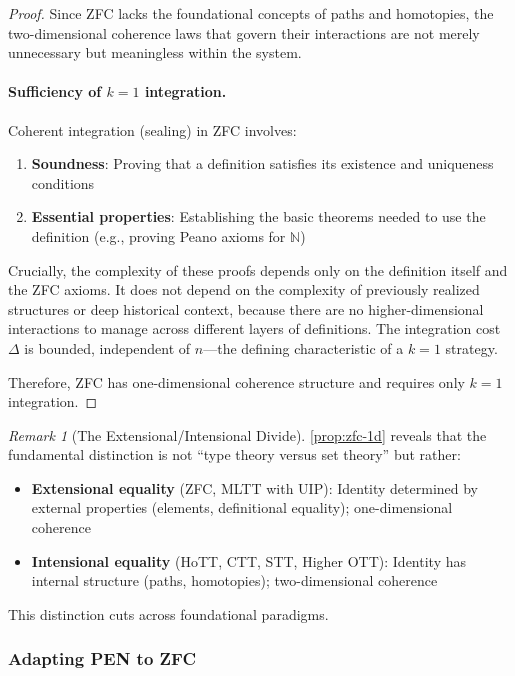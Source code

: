 \documentclass[11pt]{article}
\theoremstyle{definition}
\theoremstyle{remark}
\newtheorem{remark}[theorem]{Remark}
\begin{document}
\begin{proof}
Since ZFC lacks the foundational concepts of paths and homotopies, the two-dimensional coherence laws that govern their interactions are not merely unnecessary but meaningless within the system.

\paragraph{Sufficiency of $k=1$ integration.}
Coherent integration (sealing) in ZFC involves:
\begin{enumerate}
\item \textbf{Soundness}: Proving that a definition satisfies its existence and uniqueness conditions
\item \textbf{Essential properties}: Establishing the basic theorems needed to use the definition (e.g., proving Peano axioms for $\mathbb{N}$)
\end{enumerate}

Crucially, the complexity of these proofs depends only on the definition itself and the ZFC axioms. It does not depend on the complexity of previously realized structures or deep historical context, because there are no higher-dimensional interactions to manage across different layers of definitions. The integration cost $\Delta$ is bounded, independent of $n$---the defining characteristic of a $k=1$ strategy.

Therefore, ZFC has one-dimensional coherence structure and requires only $k=1$ integration.
\end{proof}

\begin{remark}[The Extensional/Intensional Divide]
\cref{prop:zfc-1d} reveals that the fundamental distinction is not ``type theory versus set theory'' but rather:
\begin{itemize}
\item \textbf{Extensional equality} (ZFC, MLTT with UIP): Identity determined by external properties (elements, definitional equality); one-dimensional coherence
\item \textbf{Intensional equality} (HoTT, CTT, STT, Higher OTT): Identity has internal structure (paths, homotopies); two-dimensional coherence
\end{itemize}
This distinction cuts across foundational paradigms.
\end{remark}

\subsubsection{Adapting PEN to ZFC}
\end{document}
